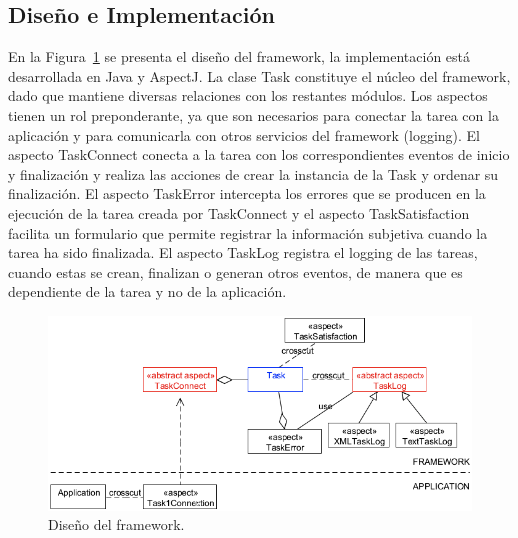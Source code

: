 \subsection{Diseño e Implementación}
\label{subsec:disenio_e_implementacion}

En la Figura~\ref{fig:fig3} se presenta el diseño del framework, la implementación está desarrollada en Java y AspectJ. La clase Task constituye el núcleo del framework, dado que mantiene diversas relaciones con los restantes módulos. Los aspectos tienen un rol preponderante, ya que son necesarios para conectar la tarea con la aplicación y para comunicarla con otros servicios del framework (logging). El aspecto TaskConnect conecta a la tarea con los correspondientes eventos de inicio y finalización y realiza las acciones de crear la instancia de la Task y ordenar su finalización. El aspecto TaskError intercepta los errores que se producen en la ejecución de la tarea creada por TaskConnect y el aspecto TaskSatisfaction facilita un formulario que permite registrar la información subjetiva cuando la tarea ha sido finalizada. El aspecto TaskLog registra el logging de las tareas, cuando estas se crean, finalizan o generan otros eventos, de manera que es dependiente de la tarea y no de la aplicación. 
\squeezeup
\begin{figure}[ht!]
	\centering
	\includegraphics[scale=0.47]{figs/fig3.png}
	\caption{\label{fig:fig3}  Diseño del framework.}
\end{figure}
\squeezeup

